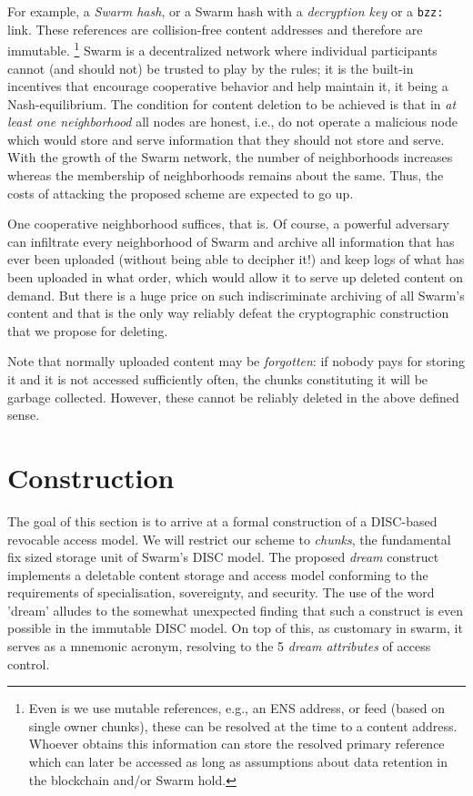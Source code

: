 For example, a \emph{Swarm hash}, or a Swarm hash with a \emph{decryption key}  or a \lstinline{bzz:} link.  These references are collision-free content addresses and therefore are immutable.%
%
\footnote{Even is we use mutable references, e.g., an ENS address, or feed (based on single owner chunks), these can be resolved at the time to a content address.  Whoever obtains this information can store the resolved primary reference which can later be accessed as long as assumptions about data retention in the blockchain and/or Swarm hold.} 
%
Swarm is a decentralized network where individual participants cannot (and should not) be trusted to play by the rules; it is the built-in incentives that encourage cooperative behavior and help maintain it, it being a Nash-equilibrium. The condition for content deletion to be achieved is that in \emph{at least one neighborhood} all nodes are honest, i.e., do not operate a malicious node which would store and serve information that they should not store and serve. With the growth of the Swarm network, the number of neighborhoods increases whereas the membership of neighborhoods remains about the same. Thus, the costs of attacking the proposed scheme are expected to go up.

One cooperative neighborhood suffices, that is. Of course, a powerful adversary can infiltrate every neighborhood of Swarm and archive all information that has ever been uploaded (without being able to decipher it!) and keep logs of what has been uploaded in what order, which would allow it to serve up deleted content on demand. But there is a huge price on such indiscriminate archiving of all Swarm's content and that is the only way reliably defeat the cryptographic construction that we propose for deleting.
                                   

Note that normally uploaded content may be \emph{forgotten}: if nobody pays for storing it and it is not accessed sufficiently often, the chunks constituting it will be garbage collected. However, these cannot be reliably deleted in the above defined sense. 

\section{Construction}

The goal of this section is to arrive at a formal construction of a DISC-based revocable access model. We will restrict our scheme to \emph{chunks}, the fundamental fix sized storage unit of Swarm's DISC model.  The proposed \emph{dream} construct implements a  deletable content storage and access model conforming to the requirements of specialisation, sovereignty, and security. The use of the word 'dream' alludes to the somewhat unexpected finding that such a construct is even possible in the immutable DISC model. On top of this, as customary in swarm, it serves as a mnemonic acronym, resolving to the 5 \emph{dream attributes} of access control.

